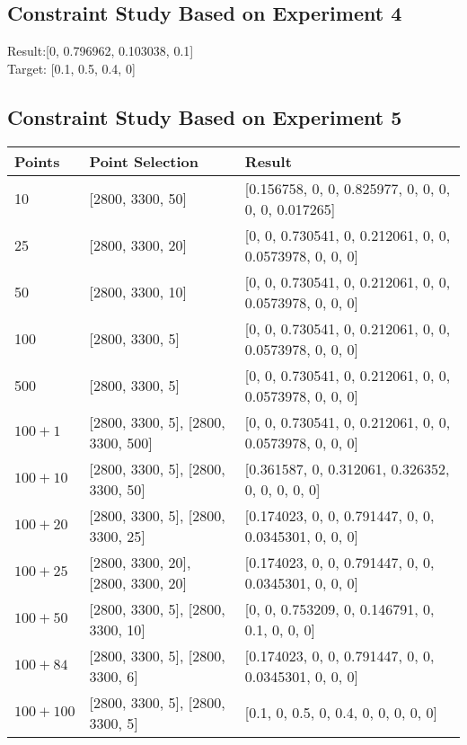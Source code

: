 \subsection{Constraint Study Based on Experiment 4}
Result:[0, 0.796962, 0.103038, 0.1]\\
Target: [0.1, 0.5, 0.4, 0]\\



\subsection{Constraint Study Based on Experiment 5}
\begin{table} \tiny
\begin{tabular}{l | p{3cm}  | p{6cm}}
\hline
Points & Point Selection & Result \\ \hline
10 & [2800, 3300, 50] & [0.156758, 0, 0, 0.825977, 0, 0, 0, 0, 0, 0.017265] \\ \hline
25 & [2800, 3300, 20] & [0, 0, 0.730541, 0, 0.212061, 0, 0, 0.0573978, 0, 0, 0] \\ \hline
50 & [2800, 3300, 10] & [0, 0, 0.730541, 0, 0.212061, 0, 0, 0.0573978, 0, 0, 0] \\ \hline
100 & [2800, 3300, 5] & [0, 0, 0.730541, 0, 0.212061, 0, 0, 0.0573978, 0, 0, 0] \\ \hline
500 & [2800, 3300, 5] & [0, 0, 0.730541, 0, 0.212061, 0, 0, 0.0573978, 0, 0, 0] \\ \hline	
$100 + 1$ & [2800, 3300, 5], [2800, 3300, 500] & [0, 0, 0.730541, 0, 0.212061, 0, 0, 0.0573978, 0, 0, 0] \\ \hline
$100 + 10$ & [2800, 3300, 5], [2800, 3300, 50] & [0.361587, 0, 0.312061, 0.326352, 0, 0, 0, 0, 0] \\ \hline
$100 + 20$ & [2800, 3300, 5], [2800, 3300, 25] & [0.174023, 0, 0, 0.791447, 0, 0, 0.0345301, 0, 0, 0] \\ \hline
$100 + 25$ & [2800, 3300, 20], [2800, 3300, 20] & [0.174023, 0, 0, 0.791447, 0, 0, 0.0345301, 0, 0, 0] \\ \hline
$100 + 50$ & [2800, 3300, 5], [2800, 3300, 10] & [0, 0, 0.753209, 0, 0.146791, 0, 0.1, 0, 0, 0] \\ \hline
$100 + 84$ & [2800, 3300, 5], [2800, 3300, 6] & [0.174023, 0, 0, 0.791447, 0, 0, 0.0345301, 0, 0, 0] \\ \hline
$100 + 100$ & [2800, 3300, 5], [2800, 3300, 5] & [0.1, 0, 0.5, 0, 0.4, 0, 0, 0, 0, 0] \\ 
\hline
\end{tabular} \\
\end{table}




